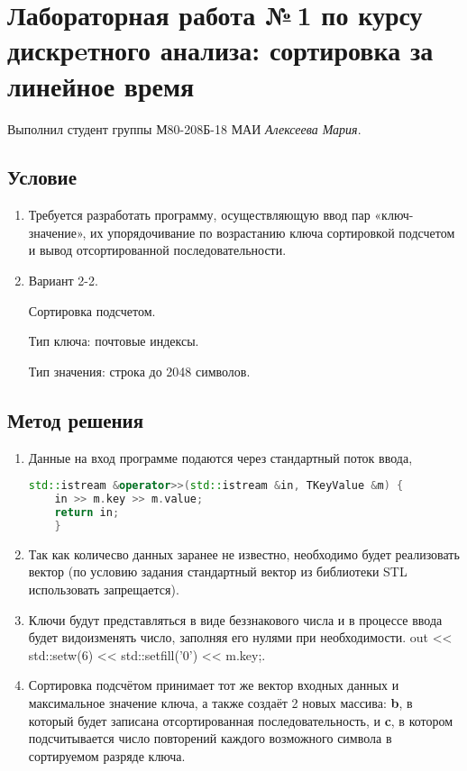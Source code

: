 \documentclass[12pt]{article}
\begin{document}
\section*{Лабораторная работа №\,1 по курсу дискрeтного анализа: сортировка за линейное время}

Выполнил студент группы М80-208Б-18 МАИ \textit{Алексеева Мария}.

\subsection*{Условие}
\begin{enumerate}
\item Требуется разработать программу, осуществляющую ввод пар «ключ-значение», их упорядочивание по возрастанию ключа сортировкой подсчетом и вывод отсортированной последовательности. 
\item Вариант 2-2.

Сортировка подсчетом.

Тип ключа: почтовые индексы.

Тип значения: строка до 2048 символов.
\end{enumerate}

\subsection*{Метод решения}

\begin{enumerate}
    \item Данные на вход программе подаются через стандартный поток ввода,   
    \begin{lstlisting}[language=C++]
    std::istream &operator>>(std::istream &in, TKeyValue &m) {
	in >> m.key >> m.value;
	return in;
    }
    \end{lstlisting}
    \item Так как количесво данных заранее не известно, необходимо будет реализовать вектор (по условию задания стандартный вектор из библиотеки STL использовать запрещается).
    \item Ключи будут представляться в виде беззнакового числа и в процессе ввода будет видоизменять число, заполняя его нулями при необходимости.      out << std::setw(6) << std::setfill('0') << m.key;.
    \item Сортировка подсчётом принимает тот же вектор входных данных и максимальное значение ключа, а также создаёт 2 новых массива: \textbf{b}, в который будет записана отсортированная последовательность, и \textbf{c}, в котором подсчитывается число повторений каждого возможного символа в сортируемом разряде ключа.
\end{enumerate}
\end{document}
